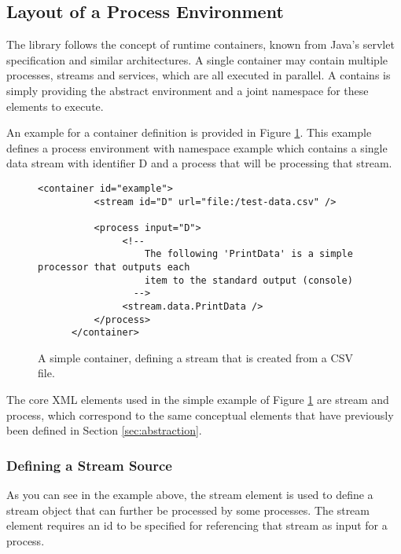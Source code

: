 
\subsection{Layout of a Process Environment}
The \streams library follows the concept of runtime containers, known from Java's
servlet specification and similar architectures. A single container may contain
multiple processes, streams and services, which are all executed in parallel. A
contains is simply providing the abstract environment and a joint namespace for
these elements to execute.

An example for a container definition is provided in Figure \ref{fig:simpleContainer}.
This example defines a process environment with namespace {\ttfamily example} which
contains a single data stream with identifier {\ttfamily D} and a process that will
be processing that stream.

\begin{figure}[h!]
	\begin{lstlisting}[showstringspaces=false]
      <container id="example">
          <stream id="D" url="file:/test-data.csv" />

          <process input="D">
               <!--
                   The following 'PrintData' is a simple processor that outputs each
                   item to the standard output (console)
                 -->
               <stream.data.PrintData />
          </process>
      </container>
	\end{lstlisting}
	\caption{\label{fig:simpleContainer}A simple container, defining a stream that is created from a CSV file.}
\end{figure}

The core XML elements used in the simple example of Figure \ref{fig:simpleContainer}
are {\ttfamily stream} and {\ttfamily process}, which correspond to the same 
conceptual elements that have previously been defined in Section \ref{sec:abstraction}.

\subsubsection{Defining a Stream Source}
As you can see in the example above, the {\ttfamily stream} element is used to define
a stream object that can further be processed by some processes. The {\ttfamily stream}
element requires an {\ttfamily id} to be specified for referencing that stream as input
for a process. 

